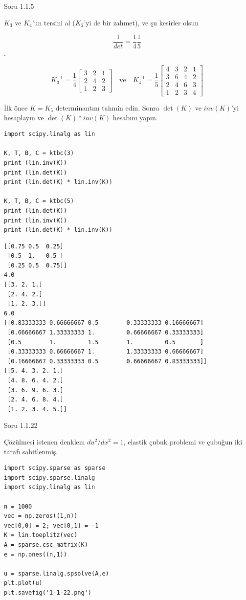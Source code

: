 \documentclass[12pt,fleqn]{article}\usepackage{../../common}
\begin{document}
Soru 1.1.5

$K_3$ ve $K_4$'un tersini al ($K_2$'yi de bir zahmet), ve şu kesirler olsun

$$ \frac{1}{det} = \frac{1}{4} \frac{1}{5}$$. 

$$
K_3^{-1} = \frac{1}{4}
\left[\begin{array}{rrr}
3 & 2 & 1 \\
2 & 4 & 2 \\
1 & 2 & 3
\end{array}\right]
\quad \textrm{ve} \quad
K_4^{-1} = \frac{1}{5}
\left[\begin{array}{rrrr}
4 & 3 & 2 & 1 \\
3 & 6 & 4 & 2 \\
2 & 4 & 6 &  3 \\
1 & 2 & 3 & 4
\end{array}\right]
$$


İlk önce $K=K_5$ determinantını tahmin edin. Sonra $\det(K)$ ve
$inv(K)$'yi hesaplayın ve $\det(K) * inv(K)$ hesabını yapın. 

\begin{verbatim}
import scipy.linalg as lin

K, T, B, C = ktbc(3)
print (lin.inv(K))
print (lin.det(K))
print (lin.det(K) * lin.inv(K))

K, T, B, C = ktbc(5)
print (lin.det(K))
print (lin.inv(K))
print (lin.det(K) * lin.inv(K))
\end{verbatim}

\begin{verbatim}
[[0.75 0.5  0.25]
 [0.5  1.   0.5 ]
 [0.25 0.5  0.75]]
4.0
[[3. 2. 1.]
 [2. 4. 2.]
 [1. 2. 3.]]
6.0
[[0.83333333 0.66666667 0.5        0.33333333 0.16666667]
 [0.66666667 1.33333333 1.         0.66666667 0.33333333]
 [0.5        1.         1.5        1.         0.5       ]
 [0.33333333 0.66666667 1.         1.33333333 0.66666667]
 [0.16666667 0.33333333 0.5        0.66666667 0.83333333]]
[[5. 4. 3. 2. 1.]
 [4. 8. 6. 4. 2.]
 [3. 6. 9. 6. 3.]
 [2. 4. 6. 8. 4.]
 [1. 2. 3. 4. 5.]]
\end{verbatim}

Soru 1.1.22

Çözülmesi istenen denklem $du^2/dx^2 = 1$, elastik çubuk problemi ve
çubuğun iki tarafı sabitlenmiş.

\begin{verbatim}
import scipy.sparse as sparse
import scipy.sparse.linalg
import scipy.linalg as lin

n = 1000
vec = np.zeros((1,n))
vec[0,0] = 2; vec[0,1] = -1
K = lin.toeplitz(vec)
A = sparse.csc_matrix(K)
e = np.ones((n,1))

u = sparse.linalg.spsolve(A,e)
plt.plot(u)
plt.savefig('1-1-22.png')
\end{verbatim}
\end{document}
